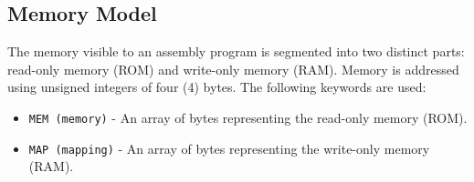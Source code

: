 \subsection*{Memory Model}
\noindent
The memory visible to an assembly program is segmented into two 
distinct parts: read-only memory (ROM) and write-only memory (RAM). 
Memory is addressed using unsigned integers of four (4) bytes. The 
following keywords are used:  
\begin{itemize}
  \item \texttt{MEM (memory)} - An array of bytes representing the 
    read-only memory (ROM).  
  \item \texttt{MAP (mapping)} - An array of bytes representing the 
    write-only memory (RAM).  
\end{itemize}
